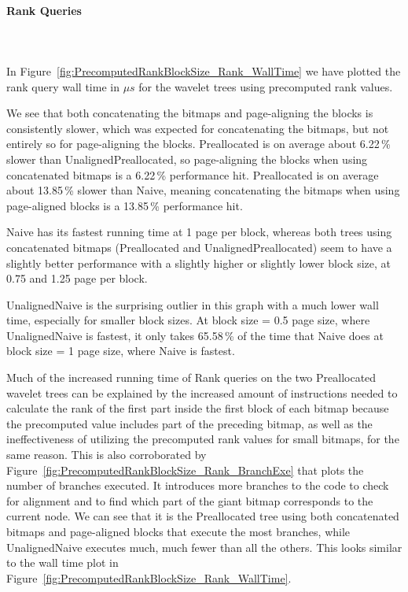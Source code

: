 \paragraph{Rank Queries}~\\\\
In Figure~\ref{fig:PrecomputedRankBlockSize_Rank_WallTime} we have plotted the rank query wall time in $\mu s$ for the wavelet trees using precomputed rank values.

We see that both concatenating the bitmaps and page-aligning the blocks is consistently slower, which was expected for concatenating the bitmaps, but not entirely so for page-aligning the blocks.
Preallocated is on average about 6.22\,\% slower than UnalignedPreallocated, so page-aligning the blocks when using concatenated bitmaps is a 6.22\,\% performance hit.
Preallocated is on average about 13.85\,\% slower than Naive, meaning concatenating the bitmaps when using page-aligned blocks is a 13.85\,\% performance hit.

Naive has its fastest running time at 1 page per block, whereas both trees using concatenated bitmaps (Preallocated and UnalignedPreallocated) seem to have a slightly better performance with a slightly higher or slightly lower block size, at 0.75 and 1.25 page per block.

UnalignedNaive is the surprising outlier in this graph with a much lower wall time, especially for smaller block sizes.
At block size = 0.5 page size, where UnalignedNaive is fastest, it only takes 65.58\,\% of the time that Naive does at block size = 1 page size, where Naive is fastest.

Much of the increased running time of Rank queries on the two Preallocated wavelet trees can be explained by the increased amount of instructions needed to calculate the rank of the first part inside the first block of each bitmap because the precomputed value includes part of the preceding bitmap, as well as the ineffectiveness of utilizing the precomputed rank values for small bitmaps, for the same reason.
This is also corroborated by Figure~\ref{fig:PrecomputedRankBlockSize_Rank_BranchExe} that plots the number of branches executed.
It introduces more branches to the code to check for alignment and to find which part of the giant bitmap corresponds to the current node.
We can see that it is the Preallocated tree using both concatenated bitmaps and page-aligned blocks that execute the most branches, while UnalignedNaive executes much, much fewer than all the others.
This looks similar to the wall time plot in Figure~\ref{fig:PrecomputedRankBlockSize_Rank_WallTime}.

